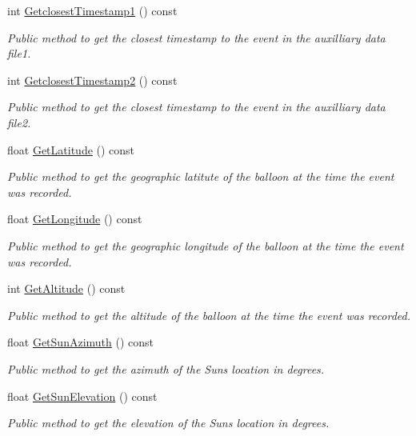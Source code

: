 \begin{DoxyCompactItemize}
int \hyperlink{classIEvent_a9f7a5fc09eeed389d07f73f64d560eeb}{Getclosest\+Timestamp1} () const
\begin{DoxyCompactList}\small\item\em Public method to get the closest timestamp to the event in the auxilliary data file1. \end{DoxyCompactList}\item 
int \hyperlink{classIEvent_a1e6f572dc2a804c962c776a6f5ec3cdf}{Getclosest\+Timestamp2} () const
\begin{DoxyCompactList}\small\item\em Public method to get the closest timestamp to the event in the auxilliary data file2. \end{DoxyCompactList}\item 
float \hyperlink{classIEvent_a38b7246b464616c40210b03289360f8b}{Get\+Latitude} () const
\begin{DoxyCompactList}\small\item\em Public method to get the geographic latitute of the balloon at the time the event was recorded. \end{DoxyCompactList}\item 
float \hyperlink{classIEvent_a1469bbbe341060a2b38180e235b2c1ec}{Get\+Longitude} () const
\begin{DoxyCompactList}\small\item\em Public method to get the geographic longitude of the balloon at the time the event was recorded. \end{DoxyCompactList}\item 
int \hyperlink{classIEvent_a0abf87cd9bf704b8ab01ec6b7779f859}{Get\+Altitude} () const
\begin{DoxyCompactList}\small\item\em Public method to get the altitude of the balloon at the time the event was recorded. \end{DoxyCompactList}\item 
float \hyperlink{classIEvent_a03e72e60f05ac529c27ed7b916561778}{Get\+Sun\+Azimuth} () const
\begin{DoxyCompactList}\small\item\em Public method to get the azimuth of the Sun\textquotesingle{}s location in degrees. \end{DoxyCompactList}\item 
float \hyperlink{classIEvent_a35b19d2db7a0b35c3d0e5219fb619976}{Get\+Sun\+Elevation} () const
\begin{DoxyCompactList}\small\item\em Public method to get the elevation of the Sun\textquotesingle{}s location in degrees. \end{DoxyCompactList}\item 

\end{DoxyCompactItemize}
